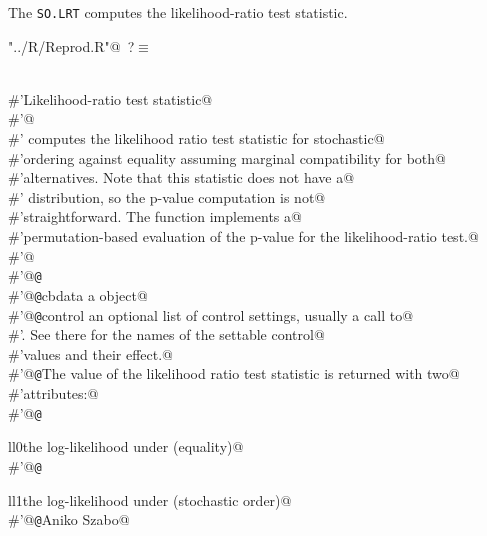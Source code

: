 \documentclass[reqno]{amsart}
\renewcommand{\NWtarget}[2]{\hypertarget{#1}{#2}}
\begin{document}
The \texttt{SO.LRT} computes the likelihood-ratio test statistic.
\begin{flushleft} \small\label{scrap36}\raggedright\small
\NWtarget{nuweb?}{} \verb@"../R/Reprod.R"@\nobreak\ {\footnotesize {?}}$\equiv$
\vspace{-1ex}
\begin{list}{}{} \item
\mbox{}\verb@@\\
\mbox{}\verb@#'Likelihood-ratio test statistic@\\
\mbox{}\verb@#'@\\
\mbox{}\verb@#' computes the likelihood ratio test statistic for stochastic@\\
\mbox{}\verb@#'ordering against equality assuming marginal compatibility for both@\\
\mbox{}\verb@#'alternatives. Note that this statistic does not have a@\\
\mbox{}\verb@#' distribution, so the p-value computation is not@\\
\mbox{}\verb@#'straightforward. The  function implements a@\\
\mbox{}\verb@#'permutation-based evaluation of the p-value for the likelihood-ratio test.@\\
\mbox{}\verb@#'@\\
\mbox{}\verb@#'@{\tt @}\verb@export@\\
\mbox{}\verb@#'@{\tt @}\verb@param cbdata a  object@\\
\mbox{}\verb@#'@{\tt @}\verb@param control an optional list of control settings, usually a call to@\\
\mbox{}\verb@#'.  See there for the names of the settable control@\\
\mbox{}\verb@#'values and their effect.@\\
\mbox{}\verb@#'@{\tt @}\verb@return The value of the likelihood ratio test statistic is returned with two@\\
\mbox{}\verb@#'attributes:@\\
\mbox{}\verb@#'@{\tt @}\verb@return \item{ll0}{the log-likelihood under  (equality)}@\\
\mbox{}\verb@#'@{\tt @}\verb@return \item{ll1}{the log-likelihood under  (stochastic order)}@\\
\mbox{}\verb@#'@{\tt @}\verb@author Aniko Szabo@\\

\end{list}
\end{flushleft}
\end{document}
